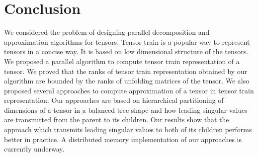 \documentclass[sigconf]{acmart}
\begin{document}

\section{Conclusion}
\label{sec:conclusion}
We considered the problem of designing parallel decomposition and approximation algorithms for tensors. Tensor train is a popular way to represent tensors in a concise way. It is based on low dimensional structure of the tensors. We proposed a parallel algorithm to compute tensor train representation of a tensor. We proved that the ranks of tensor train representation obtained by our algorithm are bounded by the ranks of unfolding matrices of the tensor. We also proposed several approaches to compute approximation of a tensor in tensor train representation. Our approaches are based on hierarchical partitioning of dimensions of a tensor in a balanced tree shape and how leading singular values are transmitted from the parent to its children. Our results show that the approach which transmits leading singular values to both of its children performs better in practice. A distributed memory implementation of our approaches is currently underway.
\end{document}
